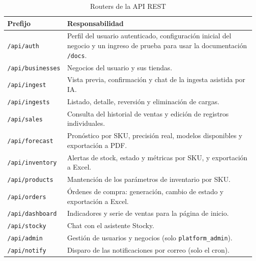 \documentclass[12pt, a4paper]{report}
\begin{document}
\begin{table}[H]
  \centering
  \caption{Routers de la API REST}
  \label{tab:routers}
  \small
  \begin{tabular}{|l|p{10.4cm}|}
    \hline
    \textbf{Prefijo} & \textbf{Responsabilidad} \\
    \hline
    \texttt{/api/auth}       & Perfil del usuario autenticado, configuración inicial del negocio y un
                               ingreso de prueba para usar la documentación \texttt{/docs}. \\
    \texttt{/api/businesses} & Negocios del usuario y sus tiendas. \\
    \texttt{/api/ingest}     & Vista previa, confirmación y chat de la ingesta asistida por IA. \\
    \texttt{/api/ingests}    & Listado, detalle, reversión y eliminación de cargas. \\
    \texttt{/api/sales}      & Consulta del historial de ventas y edición de registros individuales. \\
    \texttt{/api/forecast}   & Pronóstico por SKU, precisión real, modelos disponibles y exportación a PDF. \\
    \texttt{/api/inventory}  & Alertas de stock, estado y métricas por SKU, y exportación a Excel. \\
    \texttt{/api/products}   & Mantención de los parámetros de inventario por SKU. \\
    \texttt{/api/orders}     & Órdenes de compra: generación, cambio de estado y exportación a Excel. \\
    \texttt{/api/dashboard}  & Indicadores y serie de ventas para la página de inicio. \\
    \texttt{/api/stocky}     & Chat con el asistente Stocky. \\
    \texttt{/api/admin}      & Gestión de usuarios y negocios (solo \texttt{platform\_admin}). \\
    \texttt{/api/notify}     & Disparo de las notificaciones por correo (solo el cron). \\
    \hline
  \end{tabular}
\end{table}
\end{document}
